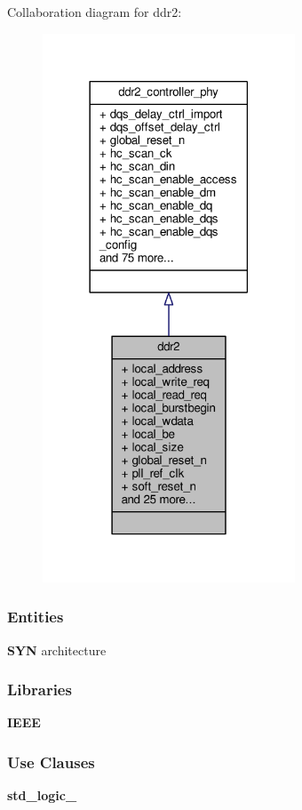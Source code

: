 Collaboration diagram for ddr2\+:\nopagebreak
\begin{figure}[H]
\begin{center}
\leavevmode
\includegraphics[width=213pt]{dd/db1/classddr2__coll__graph}
\end{center}
\end{figure}
\subsubsection*{Entities}
\begin{DoxyCompactItemize}
\item 
{\bf S\+YN} architecture
\end{DoxyCompactItemize}
\subsubsection*{Libraries}
 \begin{DoxyCompactItemize}
\item 
{\bf I\+E\+EE} 
\end{DoxyCompactItemize}
\subsubsection*{Use Clauses}
 \begin{DoxyCompactItemize}
\item 
{\bf std\+\_\+logic\+\_}   
\end{DoxyCompactItemize}
